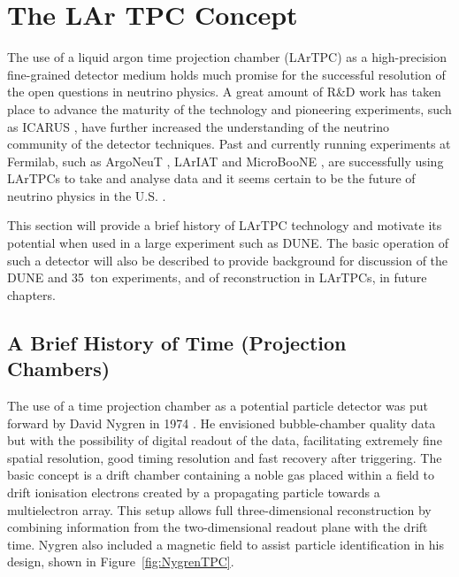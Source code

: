 \section{The LAr TPC Concept}\label{sec:LArTPC}

The use of a liquid argon time projection chamber (LArTPC) as a high-precision fine-grained detector medium holds much promise for the successful resolution of the open questions in neutrino physics.  A great amount of R\&D work has taken place to advance the maturity of the technology and pioneering experiments, such as ICARUS \cite{ICARUS2004}, have further increased the understanding of the neutrino community of the detector techniques.  Past and currently running experiments at Fermilab, such as ArgoNeuT \cite{ArgoNeuT2012}, LArIAT \cite{LArIAT2014} and MicroBooNE \cite{MicroBooNE2017}, are successfully using LArTPCs to take and analyse data and it seems certain to be the future of neutrino physics in the U.S. \cite{Baller2014}.

This section will provide a brief history of LArTPC technology and motivate its potential when used in a large experiment such as DUNE.  The basic operation of such a detector will also be described to provide background for discussion of the DUNE and 35~ton experiments, and of reconstruction in LArTPCs, in future chapters.

\subsection{A Brief History of Time (Projection Chambers)}\label{sec:LArTPCHistory}

The use of a time projection chamber as a potential particle detector was put forward by David Nygren in 1974 \cite{Nygren1974}.  He envisioned bubble-chamber quality data but with the possibility of digital readout of the data, facilitating extremely fine spatial resolution, good timing resolution and fast recovery after triggering.  The basic concept is a drift chamber containing a noble gas placed within a field to drift ionisation electrons created by a propagating particle towards a multielectron array.  This setup allows full three-dimensional reconstruction by combining information from the two-dimensional readout plane with the drift time.  Nygren also included a magnetic field to assist particle identification in his design, shown in Figure~\ref{fig:NygrenTPC}.

